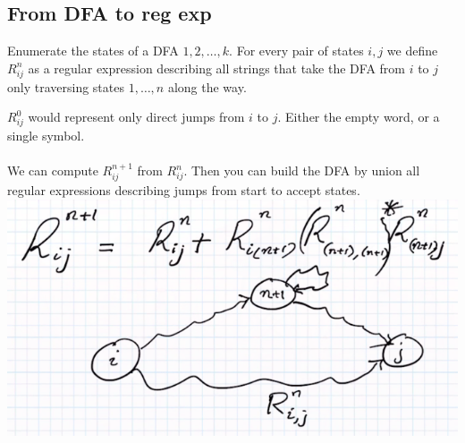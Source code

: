 \documentclass[class=scrartcl, crop=false]{standalone}
\begin{document}
\subsection{From DFA to reg exp}
Enumerate the states of a DFA $1, 2, \dots, k$. For every pair of states $i, j$
we define $R_{ij}^n$ as a regular expression describing all strings that take the
DFA from $i$ to $j$ only traversing states $1, \dots, n$ along the way.
\begin{example}
  $R_{ij}^0$ would represent only direct jumps from $i$ to $j$. Either the empty
  word, or a single symbol.
  \\\\
  We can compute $R_{ij}^{n + 1}$ from $R_{ij}^n$. Then you can build the DFA by
  union all regular expressions describing jumps from start to accept states.
  \\
  \includegraphics[width=\textwidth]{calculating_up}
\end{example}
\end{document}
